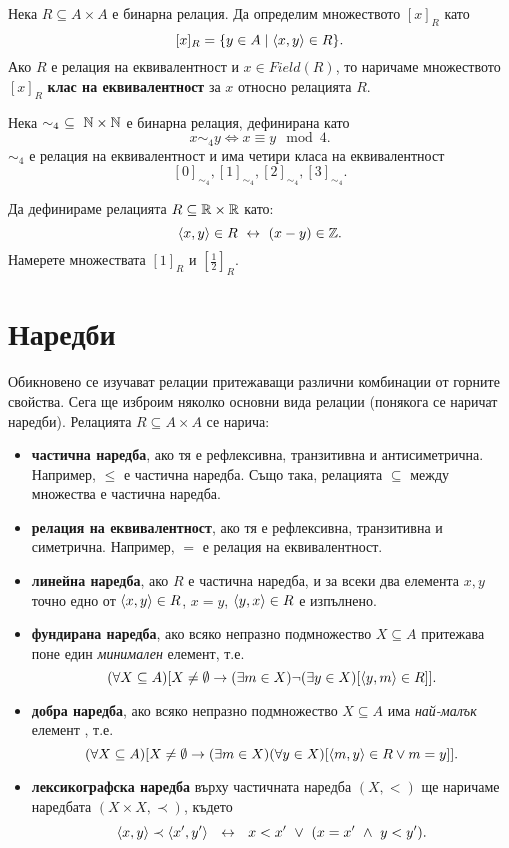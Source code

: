Нека $R \subseteq A\times A$ е бинарна релация.
Да определим множеството $[x]_R$ като
\[[x]_R = \{y\in A\mid \langle{x,y}\rangle \in R\}.\]
Ако $R$ е релация на еквивалентност и $x\in Field(R)$, то наричаме множеството $[x]_R$ {\bf клас на еквивалентност} за $x$ относно релацията $R$.

\begin{example}
  Нека $\sim_4\ \subseteq\ \mathbb{N}\times \mathbb{N}$ е бинарна релация, дефинирана като
  \[x\sim_4 y \iff x\equiv y \mod 4.\]
  $\sim_4$ е релация на еквивалентност и има четири класа на еквивалентност
  \[[0]_{\sim_4}, [1]_{\sim_4}, [2]_{\sim_4}, [3]_{\sim_4}.\]
\end{example}

\begin{problem}
  Да дефинираме релацията $R \subseteq \mathbb{R}\times \mathbb{R}$ като:
  \[\langle{x,y}\rangle\in R \ \leftrightarrow\  (x-y)\in\mathbb{Z}.\]
  Намерете множествата $[1]_R$ и $[\frac{1}{2}]_R$.
\end{problem}

\section{Наредби}
Обикновено се изучават релации притежаващи различни комбинации от горните свойства. 
Сега ще изброим няколко основни вида релации (понякога се наричат наредби).
Релацията $R \subseteq A\times A$ се нарича:
\begin{itemize}
\item
  {\bf частична наредба}, ако тя е рефлексивна, транзитивна и антисиметрична.
  Например, $\leq$ е частична наредба.
  Също така, релацията $\subseteq$ между множества е частична наредба.
\item 
  {\bf релация на еквивалентност}, ако тя е рефлексивна, транзитивна и симетрична.
  Например, $=$ е релация на еквивалентност.
\item
  {\bf линейна наредба}, ако $R$ е частична наредба, 
  и за всеки два елемента $x,y$ точно едно от $\langle{x,y}\rangle \in R$, $x = y$, $\langle{y,x}\rangle\in R$ е изпълнено.
\item
  {\bf фундирана наредба}, 
  ако всяко непразно подмножество $X\subseteq A$ притежава поне един {\em минимален} елемент, т.е.
  \[(\forall X\subseteq A)[X\neq\emptyset \rightarrow (\exists m\in X)\neg(\exists y\in X)[\langle{y,m}\rangle \in R]].\]
\item
  {\bf добра наредба}, ако всяко непразно подмножество $X\subseteq A$ има {\em най-малък} елемент , т.е.
  \[(\forall X\subseteq A)[X\neq\emptyset \rightarrow (\exists m\in X)(\forall y\in X)[\langle{m,y}\rangle\in R \vee m = y]].\]
\item
  {\bf лексикографска наредба} върху частичната наредба $(X,<)$ ще наричаме 
  наредбата $(X\times X,\prec)$, където
  \[\pair{x,y}\prec\pair{x^\prime,y^\prime}\ \iff\ x<x^\prime\ \vee\ (x = x^\prime\ \wedge\ y < y^\prime).\]
\end{itemize}

